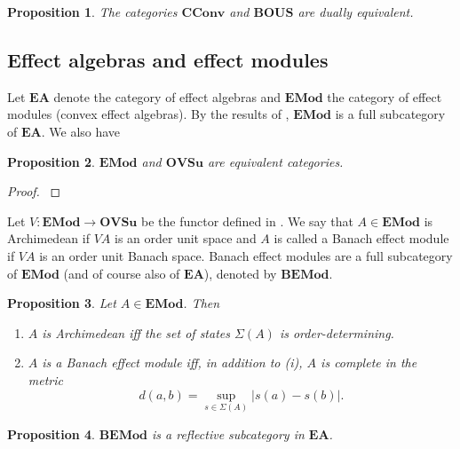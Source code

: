 \documentclass[12pt]{article}
\newtheorem{prop}{Proposition}
\newcommand{\<}{\langle}
\newcommand{\ct}[1]{\mathbf{#1}}
\begin{document}
\begin{prop}\cite{} The categories $\ct{CConv}$ and $\ct{BOUS}$ are dually equivalent.

\end{prop}









\subsection{Effect algebras and effect modules}

Let $\ct{EA}$ denote the category of effect algebras and $\ct{EMod}$ the category of effect modules (convex effect algebras). By the results of \cite{sylvia_plus3}, 
$\ct{EMod}$ is a full subcategory of $\ct{EA}$. We also have

\begin{prop}\label{prop:EMod_OVSu}   $\ct{EMod}$ and $\ct{OVSu}$ are equivalent categories.

\end{prop}

\begin{proof} \cite{sylvia_plus3} 

\end{proof}

Let $V: \ct{EMod}\to \ct{OVSu}$ be the functor defined in \cite{sylvia_plus3}. We say that $A\in \ct{EMod}$ is Archimedean if $VA$ is an order unit space and $A$ is called 
a Banach effect module  if $VA$ is an  order unit Banach space. Banach effect modules are a full subcategory of $\ct{EMod}$ (and of course also of $\ct{EA}$), denoted by 
$\ct{BEMod}$.

\begin{prop} Let $A\in \ct{EMod}$. Then 
\begin{enumerate}
\item[(i)] $A$ is Archimedean iff the set of states $\Sigma(A)$ is order-determining.
\item[(ii)]\cite{roroy} $A$ is a Banach effect module iff, in addition to (i), $A$ is complete in the metric
\[
d(a,b)=\sup_{s\in \Sigma(A)} |s(a)-s(b)|.
\] 
\end{enumerate}


\end{prop}

\begin{prop} $\ct{BEMod}$ is a reflective subcategory in $\ct{EA}$.


\end{prop}
\end{document}
